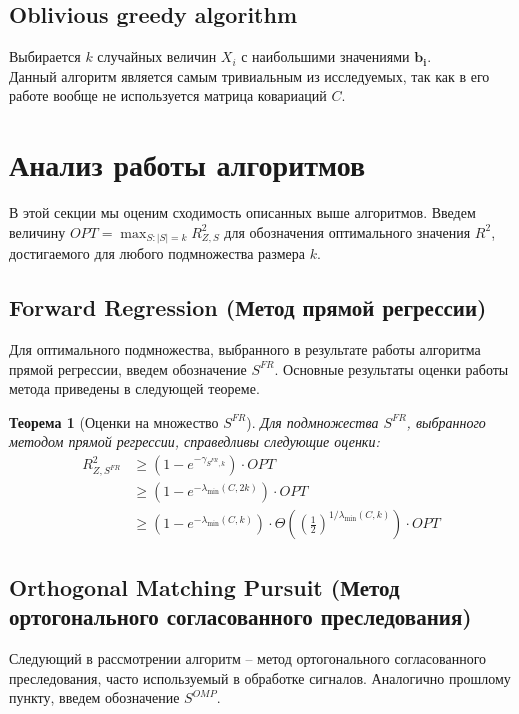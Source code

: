 \documentclass[preprint,12pt]{elsarticle}
\newtheorem{theorem}{Теорема}
\begin{document}
\subsection{Oblivious greedy algorithm}
Выбирается $k$ случайных величин $X_i$ с наибольшими значениями $\mathbf{b_i}$.\\

Данный алгоритм является самым тривиальным из исследуемых, так как в его работе вообще не используется матрица ковариаций $C$.

\section{Анализ работы алгоритмов}
В этой секции мы оценим сходимость описанных выше алгоритмов. Введем величину $OPT=\max_{S:|S|=k} R_{Z, S}^{2}$ для обозначения оптимального значения $R^2$, достигаемого для любого подмножества размера $k$. 
\subsection{Forward Regression (Метод прямой регрессии)}
Для оптимального подмножества, выбранного в результате работы алгоритма прямой регрессии, введем обозначение $S^{FR}$. Основные результаты оценки работы метода приведены в следующей теореме.
\begin{theorem}[Оценки на множество $S^{FR}$\cite{das2011submodular}]
Для подмножества $S^{FR}$, выбранного методом прямой регрессии, справедливы следующие оценки:
\begin{equation}\begin{aligned}
R_{Z, S^{F R}}^{2} & \geq\left(1-e^{-\gamma_{S^{F R}, k}}\right) \cdot OPT \\
& \geq\left(1-e^{-\lambda_{\min }(C, 2 k)}\right) \cdot OPT \\
& \geq\left(1-e^{-\lambda_{\min }(C, k)}\right) \cdot \Theta\left(\left(\frac{1}{2}\right)^{1 / \lambda_{\min }(C, k)}\right) \cdot OPT
\end{aligned}\end{equation}
\end{theorem}
\subsection{Orthogonal Matching Pursuit (Метод ортогонального согласованного преследования)}
Следующий в рассмотрении алгоритм -- метод ортогонального согласованного преследования, часто используемый в обработке сигналов. Аналогично прошлому пункту, введем обозначение $S^{OMP}$. \\
\end{document}
